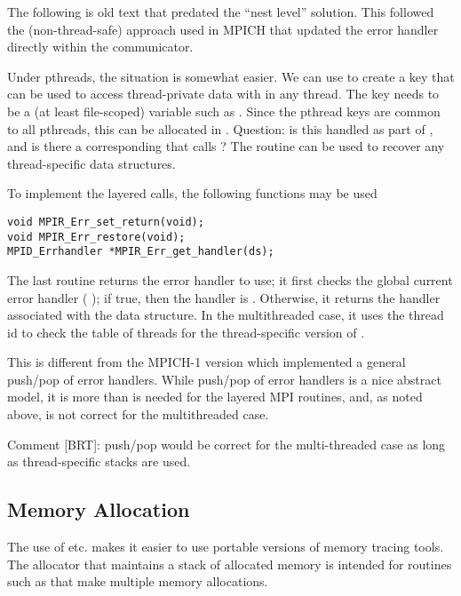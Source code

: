 \documentclass{article}
\begin{document}
The following is old text that predated the ``nest level'' solution.  This
followed the (non-thread-safe) approach used in MPICH that updated the error
handler directly within the communicator.

Under pthreads, the situation is somewhat easier.  We can use
 to create a key that can be used to access
thread-private data with  in any thread.
The key needs to be a (at least file-scoped) variable such as
. 
Since the pthread keys are common to all pthreads, this can be allocated in
.  Question: is this handled as part of
, and is there a corresponding
 that calls ?
The routine  can be used to recover any
thread-specific data structures. 

To implement the layered calls, the following functions may be 
used 
\begin{verbatim}
void MPIR_Err_set_return(void);
void MPIR_Err_restore(void);
MPID_Errhandler *MPIR_Err_get_handler(ds);
\end{verbatim}
The last routine returns the error handler to use; it first checks the
global current error handler (
); if true, then the handler is
.  Otherwise, it returns the handler
associated with the data structure.  In the multithreaded case, it
uses the thread id to check the table of threads for the
thread-specific version of .

This is different from the MPICH-1 version which implemented a general
push/pop of error handlers.  While push/pop of error handlers is a
nice abstract model, it is more than is needed for the layered MPI
routines, and, as noted above, is not correct for the multithreaded
case.

Comment [BRT]: push/pop would be correct for the multi-threaded case
as long as thread-specific stacks are used.

\subsection{Memory Allocation}
The use of  etc. makes it easier to use portable versions of
memory tracing tools.  The allocator that maintains a stack of allocated
memory is intended for routines such as  that make
multiple memory allocations.
\end{document}

